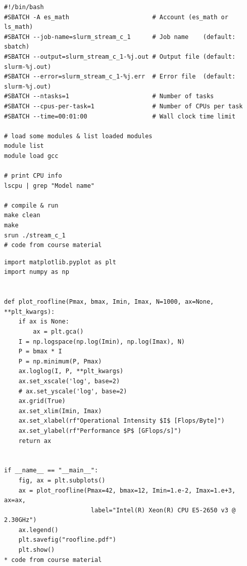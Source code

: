 \documentclass[unicode,11pt,a4paper,oneside,numbers=endperiod,openany]{scrartcl}
\begin{document}
\begin{lstlisting}[language=MyBatch, style=mystyle, caption={The batch scripts of STREAM benchmark}]
#!/bin/bash
#SBATCH -A es_math                       # Account (es_math or ls_math)
#SBATCH --job-name=slurm_stream_c_1      # Job name    (default: sbatch)
#SBATCH --output=slurm_stream_c_1-%j.out # Output file (default: slurm-%j.out)
#SBATCH --error=slurm_stream_c_1-%j.err  # Error file  (default: slurm-%j.out)
#SBATCH --ntasks=1                       # Number of tasks
#SBATCH --cpus-per-task=1                # Number of CPUs per task
#SBATCH --time=00:01:00                  # Wall clock time limit

# load some modules & list loaded modules
module list
module load gcc

# print CPU info
lscpu | grep "Model name"

# compile & run
make clean
make
srun ./stream_c_1
# code from course material
\end{lstlisting}

\begin{lstlisting}[language=MyPython, style=mystyle, caption={Draw the picture roofline model}]
import matplotlib.pyplot as plt
import numpy as np


def plot_roofline(Pmax, bmax, Imin, Imax, N=1000, ax=None, **plt_kwargs):
    if ax is None:
        ax = plt.gca()
    I = np.logspace(np.log(Imin), np.log(Imax), N)
    P = bmax * I
    P = np.minimum(P, Pmax)
    ax.loglog(I, P, **plt_kwargs)
    ax.set_xscale('log', base=2)
    # ax.set_yscale('log', base=2)
    ax.grid(True)
    ax.set_xlim(Imin, Imax)
    ax.set_xlabel(rf"Operational Intensity $I$ [Flops/Byte]")
    ax.set_ylabel(rf"Performance $P$ [GFlops/s]")
    return ax


if __name__ == "__main__":
    fig, ax = plt.subplots()
    ax = plot_roofline(Pmax=42, bmax=12, Imin=1.e-2, Imax=1.e+3, ax=ax,
                        label="Intel(R) Xeon(R) CPU E5-2650 v3 @ 2.30GHz")
    ax.legend()
    plt.savefig("roofline.pdf")
    plt.show()
* code from course material
\end{lstlisting}
\end{document}
